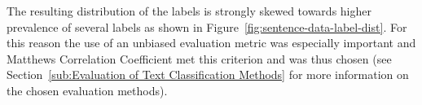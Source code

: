 The resulting distribution of the labels is strongly skewed towards higher prevalence of several labels as shown in Figure~\ref{fig:sentence-data-label-dist}. For this reason the use of an unbiased evaluation metric was especially important and Matthews Correlation Coefficient met this criterion and was thus chosen (see Section~\ref{sub:Evaluation of Text Classification Methods} for more information on the chosen evaluation methods).

